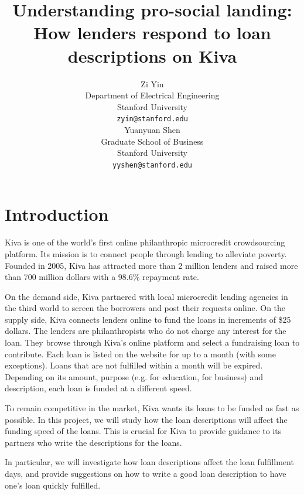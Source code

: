\documentclass{article} %
\title{Understanding pro-social landing: How lenders respond to loan descriptions on Kiva
}
\author{
Zi Yin \\
Department of Electrical Engineering\\
Stanford University\\
\texttt{zyin@stanford.edu} \\
\And
Yuanyuan Shen \\
Graduate School of Business \\
Stanford University \\
\texttt{yyshen@stanford.edu} \\
}
\begin{document}
\maketitle

\section{Introduction}
Kiva is one of the world's first online philanthropic microcredit crowdsourcing platform. Its mission is to connect people through lending to alleviate poverty. Founded in 2005, Kiva has attracted more than 2 million lenders and raised more than 700 million dollars with a 98.6\% repayment rate. 

On the demand side, Kiva partnered with local microcredit lending agencies in the third world to screen the borrowers and post their requests online. On the supply side, Kiva connects lenders online to fund the loans in increments of \$25 dollars. The lenders are philanthropists who do not charge any interest for the loan. They browse through Kiva's online platform and select a fundraising loan to contribute. Each loan is listed on the website for up to a month (with some exceptions). Loans that are not fulfilled within a month will be expired.  Depending on its amount, purpose (e.g. for education, for business) and description, each loan is funded at a different speed. 

To remain competitive in the market, Kiva wants its loans to be funded as fast as possible. In this project, we will study how the loan descriptions will affect the funding speed of the loans. This is crucial for Kiva to provide guidance to its partners who write the descriptions for the loans. 

In particular, we will investigate how loan descriptions affect the loan fulfillment days, and provide suggestions on how to write a good loan description to have one's loan quickly fulfilled.
\end{document}

